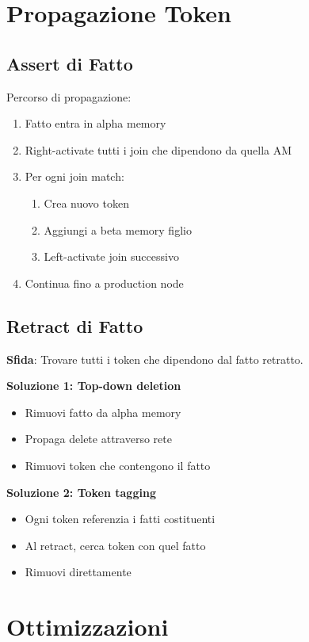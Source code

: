 \section{Propagazione Token}

\subsection{Assert di Fatto}

Percorso di propagazione:
\begin{enumerate}
\item Fatto entra in alpha memory
\item Right-activate tutti i join che dipendono da quella AM
\item Per ogni join match:
  \begin{enumerate}
  \item Crea nuovo token
  \item Aggiungi a beta memory figlio
  \item Left-activate join successivo
  \end{enumerate}
\item Continua fino a production node
\end{enumerate}

\subsection{Retract di Fatto}

\textbf{Sfida}: Trovare tutti i token che dipendono dal fatto retratto.

\textbf{Soluzione 1: Top-down deletion}
\begin{itemize}
\item Rimuovi fatto da alpha memory
\item Propaga delete attraverso rete
\item Rimuovi token che contengono il fatto
\end{itemize}

\textbf{Soluzione 2: Token tagging}
\begin{itemize}
\item Ogni token referenzia i fatti costituenti
\item Al retract, cerca token con quel fatto
\item Rimuovi direttamente
\end{itemize}

\section{Ottimizzazioni}

